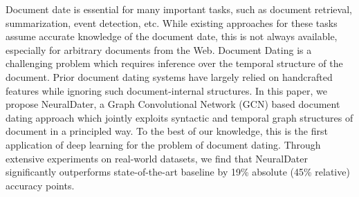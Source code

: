 Document date is essential for many important tasks, such as document retrieval, summarization, event detection, etc. While existing approaches for these tasks assume accurate knowledge of the document date, this is not always available, especially for arbitrary documents from the Web. Document Dating is a challenging problem which requires inference over the temporal structure of the document. Prior document dating systems have largely relied on handcrafted features while ignoring such document-internal structures. In this paper, we propose NeuralDater, a Graph Convolutional Network (GCN) based document dating approach which jointly exploits syntactic and temporal graph structures of document in a principled way. To the best of our knowledge, this is the first application of deep learning for the problem of document dating. Through extensive experiments on real-world datasets, we find that NeuralDater significantly outperforms state-of-the-art baseline by 19\% absolute (45\% relative) accuracy points.
